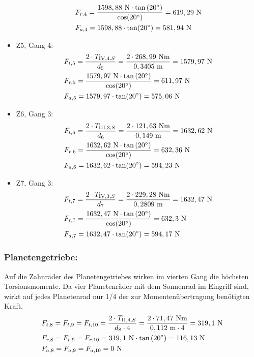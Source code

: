 \begin{itemize}
\begin{align*}
	&F_{r,4} = \frac{1598,88 \text{ N} \cdot \tan{(20^\circ)}}{\cos(20^\circ)} = 619,29\text{ N}\\ 
	&F_{a,4} = 1598,88 \cdot \tan(20^\circ) = 581,94 \text{ N}
\end{align*}
\item Z5, Gang 4:
\begin{align*}
	&F_{t,5} = \frac{2\cdot T_{\mathrm{IV},4,S}}{d_5} = \frac{2 \cdot 268,99 \text{ Nm}}{0,3405 \text{ m}} = 1579,97 \text{ N}\\ 
	&F_{r,5} = \frac{1579,97 \text{ N} \cdot \tan{(20^\circ)}}{\cos(20^\circ)} = 611,97\text{ N}\\ 
	&F_{a,5} = 1579,97 \cdot \tan(20^\circ) = 575,06 \text{ N}
\end{align*}
\item Z6, Gang 3:
\begin{align*}
	&F_{t,6} = \frac{2\cdot T_{\mathrm{III},3,S}}{d_6} = \frac{2 \cdot 121,63 \text{ Nm}}{0,149 \text{ m}} = 1632,62 \text{ N}\\ 
	&F_{r,6} = \frac{1632,62 \text{ N} \cdot \tan{(20^\circ)}}{\cos(20^\circ)} = 632,36\text{ N}\\ 
	&F_{a,6} = 1632,62 \cdot \tan(20^\circ) = 594,23 \text{ N}
\end{align*}
\item Z7, Gang 3:
\begin{align*}
	&F_{t,7} = \frac{2\cdot T_{\mathrm{IV},3,S}}{d_7} = \frac{2 \cdot 229,28 \text{ Nm}}{0,2809 \text{ m}} = 1632,47 \text{ N}\\ 
	&F_{r,7} = \frac{1632,47 \text{ N} \cdot \tan{(20^\circ)}}{\cos(20^\circ)} = 632,3\text{ N}\\ 
	&F_{a,7} = 1632,47 \cdot \tan(20^\circ) = 594,17 \text{ N}
\end{align*}
\end{itemize}
\subsubsection {Planetengetriebe:}
Auf die Zahnräder des Planetengetriebes wirken im vierten Gang die höchsten Torsionsmomente. Da vier Planetenräder mit dem Sonnenrad im Eingriff sind, wirkt auf jedes Planetenrad nur 1/4 der zur Momentenübertragung benötigten Kraft.
\begin{align*}
	&F_{t,8} = F_{t,9}= F_{t,10}=\frac{2\cdot T_{\mathrm{II},4,S}}{d_8 \cdot 4} = \frac{2 \cdot 71,47 \text{ Nm}}{0,112 \text{ m} \cdot 4} = 319,1\text{ N}\\ 
	&F_{r,8} = F_{r,9}= F_{r,10}=319,1 \text{ N} \cdot \tan{(20^\circ)} = 116,13\text{ N}\\ 
	&F_{a,8} = F_{a,9}= F_{a,10}=0 \text{ N}\\
\end{align*}
